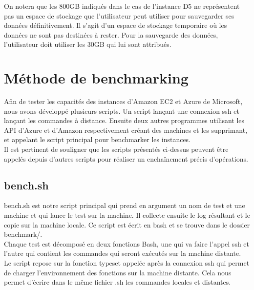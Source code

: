 \documentclass[11pt]{article}
\begin{document}
On notera que les 800GB indiqués dans le cas de l'instance D5 ne représentent pas un espace de stockage que l'utilisateur peut utiliser pour sauvegarder ses données définitivement. Il s'agit d'un espace de stockage temporaire où les données ne sont pas destinées à rester. Pour la sauvegarde des données, l'utilisateur doit utiliser les 30GB qui lui sont attribués.

\section{Méthode de benchmarking}

Afin de tester les capacités des instances d'Amazon EC2 et Azure de Microsoft,
nous avons développé plusieurs scripts. Un script lançant une connexion ssh et
lançant les commandes à distance. Ensuite deux autres programmes utilisant les
API d'Azure et d'Amazon respectivement créant des machines et les supprimant,
et appelant le script principal pour benchmarker les instances.\\
Il est pertinent de souligner que les scripts présentés ci-dessus peuvent être appelés depuis d'autres scripts pour réaliser un enchaînement précis d'opérations.
\subsection{bench.sh}
bench.sh est notre script principal qui prend en argument un nom de test et une
machine et qui lance le test sur la machine. Il collecte ensuite le log
résultant et le copie sur la machine locale. Ce script est écrit en bash et se
trouve dans le dossier benchmark/. \\
Chaque test est décomposé en deux fonctions Bash, une qui va faire l'appel ssh
et l'autre qui contient les commandes qui seront exécutés sur la machine distante. 
Le script repose sur la fonction typeset appelée après la connexion ssh qui
permet de charger l'environnement des fonctions sur la machine distante. Cela
nous permet d'écrire dans le même fichier .sh les commandes locales et 
distantes.
\end{document}
